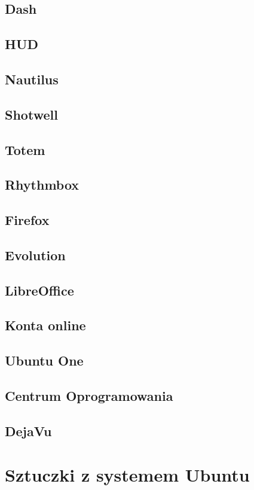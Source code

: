 \documentclass[a4paper,11pt,oneside]{mwart}
\begin{document}
        \subsection{Dash}
        \subsection{HUD}
        \subsection{Nautilus}
        \subsection{Shotwell}
        \subsection{Totem}
        \subsection{Rhythmbox}
        \subsection{Firefox}
        \subsection{Evolution}
        \subsection{LibreOffice}
        \subsection{Konta online}
        \subsection{Ubuntu One}
        \subsection{Centrum Oprogramowania}
        \subsection{DejaVu}
\section{Sztuczki z systemem Ubuntu}
\end{document}
